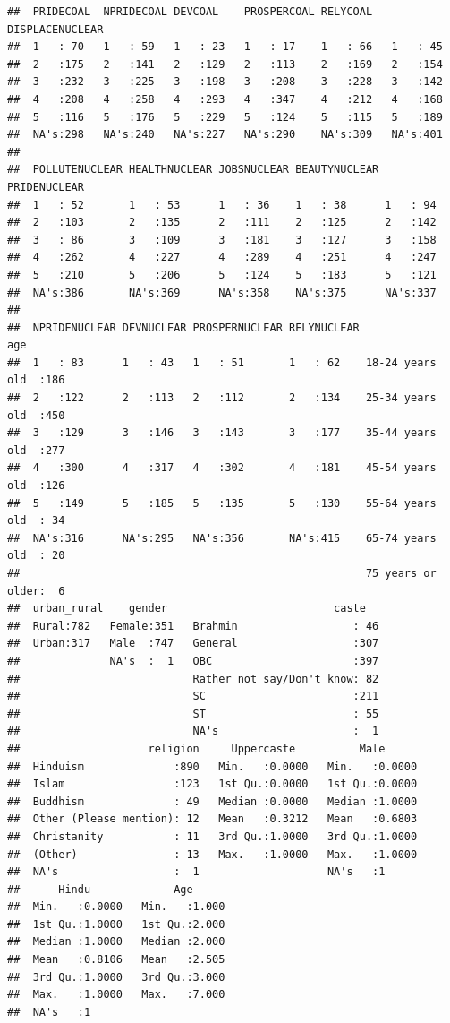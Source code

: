 \documentclass[
]{article}
\begin{document}
\begin{verbatim}
##  PRIDECOAL  NPRIDECOAL DEVCOAL    PROSPERCOAL RELYCOAL   DISPLACENUCLEAR
##  1   : 70   1   : 59   1   : 23   1   : 17    1   : 66   1   : 45       
##  2   :175   2   :141   2   :129   2   :113    2   :169   2   :154       
##  3   :232   3   :225   3   :198   3   :208    3   :228   3   :142       
##  4   :208   4   :258   4   :293   4   :347    4   :212   4   :168       
##  5   :116   5   :176   5   :229   5   :124    5   :115   5   :189       
##  NA's:298   NA's:240   NA's:227   NA's:290    NA's:309   NA's:401       
##                                                                         
##  POLLUTENUCLEAR HEALTHNUCLEAR JOBSNUCLEAR BEAUTYNUCLEAR PRIDENUCLEAR
##  1   : 52       1   : 53      1   : 36    1   : 38      1   : 94    
##  2   :103       2   :135      2   :111    2   :125      2   :142    
##  3   : 86       3   :109      3   :181    3   :127      3   :158    
##  4   :262       4   :227      4   :289    4   :251      4   :247    
##  5   :210       5   :206      5   :124    5   :183      5   :121    
##  NA's:386       NA's:369      NA's:358    NA's:375      NA's:337    
##                                                                     
##  NPRIDENUCLEAR DEVNUCLEAR PROSPERNUCLEAR RELYNUCLEAR                age     
##  1   : 83      1   : 43   1   : 51       1   : 62    18-24 years old  :186  
##  2   :122      2   :113   2   :112       2   :134    25-34 years old  :450  
##  3   :129      3   :146   3   :143       3   :177    35-44 years old  :277  
##  4   :300      4   :317   4   :302       4   :181    45-54 years old  :126  
##  5   :149      5   :185   5   :135       5   :130    55-64 years old  : 34  
##  NA's:316      NA's:295   NA's:356       NA's:415    65-74 years old  : 20  
##                                                      75 years or older:  6  
##  urban_rural    gender                          caste    
##  Rural:782   Female:351   Brahmin                  : 46  
##  Urban:317   Male  :747   General                  :307  
##              NA's  :  1   OBC                      :397  
##                           Rather not say/Don't know: 82  
##                           SC                       :211  
##                           ST                       : 55  
##                           NA's                     :  1  
##                    religion     Uppercaste          Male       
##  Hinduism              :890   Min.   :0.0000   Min.   :0.0000  
##  Islam                 :123   1st Qu.:0.0000   1st Qu.:0.0000  
##  Buddhism              : 49   Median :0.0000   Median :1.0000  
##  Other (Please mention): 12   Mean   :0.3212   Mean   :0.6803  
##  Christanity           : 11   3rd Qu.:1.0000   3rd Qu.:1.0000  
##  (Other)               : 13   Max.   :1.0000   Max.   :1.0000  
##  NA's                  :  1                    NA's   :1       
##      Hindu             Age       
##  Min.   :0.0000   Min.   :1.000  
##  1st Qu.:1.0000   1st Qu.:2.000  
##  Median :1.0000   Median :2.000  
##  Mean   :0.8106   Mean   :2.505  
##  3rd Qu.:1.0000   3rd Qu.:3.000  
##  Max.   :1.0000   Max.   :7.000  
##  NA's   :1
\end{verbatim}
\end{document}
